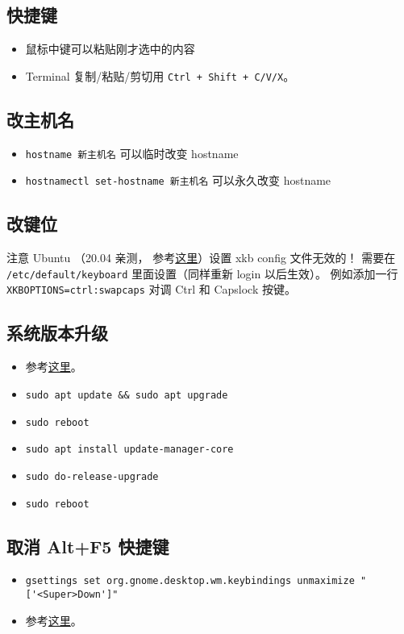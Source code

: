 
\subsection{快捷键}
\begin{itemize}
\item 鼠标中键可以粘贴刚才选中的内容
\item Terminal 复制/粘贴/剪切用 \verb`Ctrl + Shift + C/V/X`。
\end{itemize}


\subsection{改主机名}
\begin{itemize}
\item \verb|hostname 新主机名| 可以临时改变 hostname
\item \verb|hostnamectl set-hostname 新主机名| 可以永久改变 hostname
\end{itemize}


\subsection{改键位}\label{sub_Ubuntu_1}
注意 Ubuntu （20.04 亲测， 参考\href{https://manpages.ubuntu.com/manpages/focal/en/man5/keyboard.5.html}{这里}）设置 xkb config 文件无效的！ 需要在 \verb|/etc/default/keyboard| 里面设置（同样重新 login 以后生效）。 例如添加一行 \verb|XKBOPTIONS=ctrl:swapcaps| 对调 Ctrl 和 Capslock 按键。

\subsection{系统版本升级}
\begin{itemize}
\item 参考\href{https://www.cyberciti.biz/faq/upgrade-ubuntu-18-04-to-20-04-lts-using-command-line/#Make_a_backup}{这里}。
\item \verb|sudo apt update && sudo apt upgrade|
\item \verb|sudo reboot|
\item \verb|sudo apt install update-manager-core|
\item \verb|sudo do-release-upgrade|
\item \verb|sudo reboot|
\end{itemize}

\subsection{取消 Alt+F5 快捷键}
\begin{itemize}
\item \verb|gsettings set org.gnome.desktop.wm.keybindings unmaximize "['<Super>Down']"|
\item 参考\href{https://askubuntu.com/questions/1322105/cant-find-alt-f5-in-settings-keyboard-shortcuts}{这里}。
\end{itemize}

